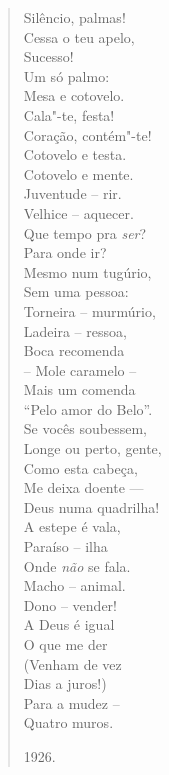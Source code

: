 \begin{verse}
Silêncio, palmas! \\
Cessa o teu apelo, \\
Sucesso! \\
Um só palmo: \\
Mesa e cotovelo. \\[8pt]
Cala"-te, festa! \\
Coração, contém"-te! \\
Cotovelo e testa. \\
Cotovelo e mente. \\[8pt]
Juventude -- rir. \\
Velhice -- aquecer. \\
Que tempo pra \emph{ser}? \\
Para onde ir? \\[8pt]
Mesmo num tugúrio, \\
Sem uma pessoa: \\
Torneira -- murmúrio, \\
Ladeira -- ressoa, \\[8pt]
Boca recomenda \\
-- Mole caramelo -- \\
Mais um comenda \\
``Pelo amor do Belo''. \\[8pt]
Se vocês soubessem, \\
Longe ou perto, gente, \\
Como esta cabeça, \\
Me deixa doente --- \\[8pt]
Deus numa quadrilha! \\
A estepe é vala, \\
Paraíso -- ilha \\
Onde \emph{não} se fala. \\[8pt]
Macho -- animal. \\
Dono -- vender! \\
A Deus é igual \\
O que me der \\[8pt]
(Venham de vez \\
Dias a juros!) \\
Para a mudez -- \\
Quatro muros. \\
\begin{flushright}
1926.
  \end{flushright}
  \end{verse}

